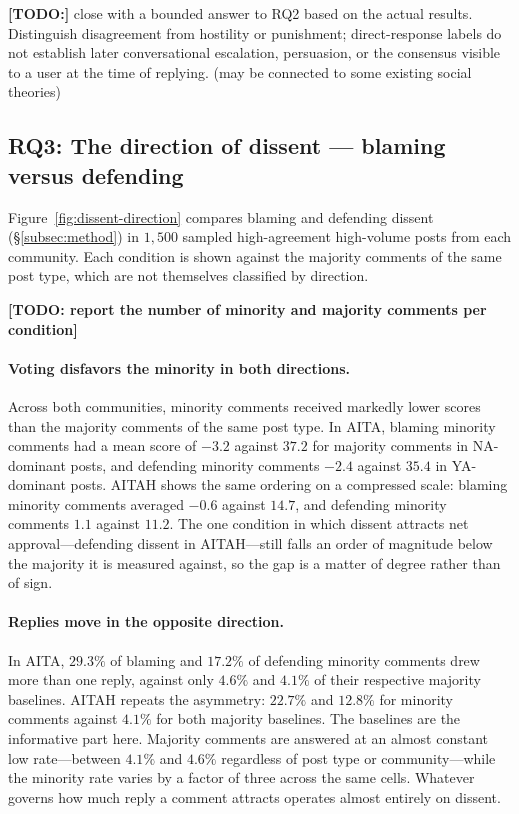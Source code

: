 \textbf{[TODO:]} close with a bounded answer to RQ2 based on the actual results.
Distinguish disagreement from hostility or punishment; direct-response labels
do not establish later conversational escalation, persuasion, or the consensus
visible to a user at the time of replying. (may be connected to some existing social theories)



\subsection{RQ3: The direction of dissent --- blaming versus defending}
\label{subsec:res-direction}

Figure~\ref{fig:dissent-direction} compares blaming and defending dissent
(\S\ref{subsec:method}) in $1{,}500$ sampled high-agreement high-volume posts from
each community. Each condition is shown against the majority comments of the
same post type, which are not themselves classified by direction.

\textbf{[TODO: report the number of minority and majority comments per
condition]}

\paragraph{Voting disfavors the minority in both directions.}
Across both communities, minority comments received markedly lower scores than
the majority comments of the same post type. In AITA, blaming minority
comments had a mean score of $-3.2$ against $37.2$ for majority comments in
NA-dominant posts, and defending minority comments $-2.4$ against $35.4$ in
YA-dominant posts. AITAH shows the same ordering on a compressed scale:
blaming minority comments averaged $-0.6$ against $14.7$, and defending
minority comments $1.1$ against $11.2$. The one condition in which dissent
attracts net approval---defending dissent in AITAH---still falls an order of
magnitude below the majority it is measured against, so the gap is a matter of
degree rather than of sign.

\paragraph{Replies move in the opposite direction.}
In AITA, $29.3\%$ of blaming and $17.2\%$ of defending minority comments drew
more than one reply, against only $4.6\%$ and $4.1\%$ of their respective
majority baselines. AITAH repeats the asymmetry: $22.7\%$ and $12.8\%$ for
minority comments against $4.1\%$ for both majority baselines. The baselines
are the informative part here. Majority comments are answered at an almost
constant low rate---between $4.1\%$ and $4.6\%$ regardless of post type or
community---while the minority rate varies by a factor of three across the same
cells. Whatever governs how much reply a comment attracts operates almost
entirely on dissent.

